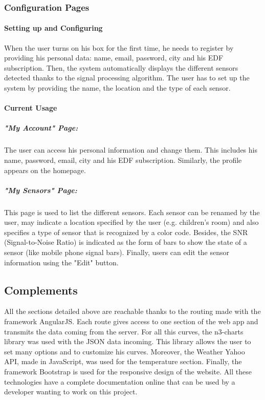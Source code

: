 \subsubsection{Configuration Pages}
    
    \paragraph{Setting up and Configuring} %
    
    When the user turns on his box for the first time, he needs to register by providing his personal data: name, email, password, city and his EDF subscription. Then, the system automatically displays the different sensors detected thanks to the signal processing algorithm. The user has to set up the system by providing the name, the location and the type of each sensor. %
    
    \paragraph{Current Usage} %
    
    \subparagraph{"My Account" Page:} 
    The user can access his personal information and change them. This includes his name, password, email, city and his EDF subscription. Similarly, the profile appears on the homepage.
    
    \subparagraph{"My Sensors" Page:}
    This page is used to list the different sensors. Each sensor can be renamed by the user, may indicate a location specified by the user (e.g. children's room) and also specifies a type of sensor that is recognized by a color code. Besides, the SNR (Signal-to-Noise Ratio) is indicated as the form of bars to show the state of a sensor (like mobile phone signal bars). Finally, users can edit the sensor information using the "Edit" button.
    \subsection{Complements}
    All the sections detailed above are reachable thanks to the routing made with the framework AngularJS. Each route gives access to one section of the web app and transmits the data coming from the server.
    For all this curves, the n3-charts library was used with the JSON data incoming. This library allows the user to set many options and to customize his curves.
    Moreover, the Weather Yahoo API, made in JavaScript, was used for the temperature section.
    Finally, the framework Bootstrap is used for the responsive design of the website.
    All these technologies have a complete documentation online that can be used by a developer wanting to work on this project.
